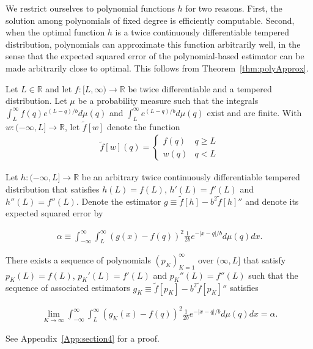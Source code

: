 \documentclass[11pt]{article}
\newcommand{\R}{\mathbb{R}}
\begin{document}
We restrict ourselves to polynomial functions $h$ for two reasons.
First, the solution among polynomials of fixed degree is efficiently computable. Second, when the optimal function $h$ is a twice continuously differentiable tempered distribution, polynomials can approximate this function arbitrarily well, in the sense that the expected squared error of the polynomial-based estimator can be made arbitrarily close to optimal. This follows from Theorem~\ref{thm:polyApprox}.

\begin{theorem}
    \label{thm:polyApprox}
    Let $L \in \R$ and let $f:[L,\infty) \to \R$ be twice differentiable and a tempered distribution. Let $\mu$ be a probability measure such that the integrals $\int_L^\infty f(q) e^{(L-q)/b} d\mu(q)$ and $\int_L^\infty e^{(L-q)/b} d\mu(q)$ exist and are finite. With $w:(-\infty,L] \to \R$, let $\tilde{f}[w]$ denote the function
    \begin{align}
    \tilde{f}[w](q) = \left\{\begin{matrix} f(q) & q \ge L\\ w(q) & q < L\end{matrix}  \right.
    \end{align}
    
    Let $h:(-\infty,L] \to \R$ be an arbitrary twice continuously differentiable tempered distribution that satisfies $h(L) = f(L)$, $h'(L) = f'(L)$ and $h''(L) = f''(L)$. Denote the estimator $g \equiv \tilde{f}[h] - b^2 \tilde{f}[h]''$ and denote its expected squared error by 

    \begin{align}
        \alpha \equiv \int_{-\infty}^\infty \int_L^\infty \left(g(x) - f(q)\right)^2 \frac{1}{2b} e^{-|x-q|/b} d\mu(q) dx.
    \end{align}

    There exists a sequence of polynomials $(p_K)_{K=1}^\infty$ over $(\infty,L]$ that satisfy $p_K(L) = f(L)$, $p_K'(L) = f'(L)$ and $p_K''(L) = f''(L)$ such that the sequence of associated estimators $g_K \equiv \tilde{f}[p_K] - b^2 \tilde{f}[p_K]''$ satisfies

    \begin{align}
        \lim_{K \to \infty} \int_{-\infty}^\infty \int_L^\infty \left(g_K(x) - f(q)\right)^2 \frac{1}{2b} e^{-|x-q|/b} d\mu(q) dx = \alpha.
    \end{align}
\end{theorem}

See Appendix~\ref{App:section4} for a proof.
\end{document}
